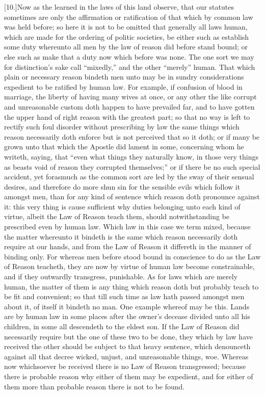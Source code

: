 [10.]Now as the learned in the laws of this land observe, that our statutes sometimes are only the affirmation or ratification of that which by common law was held before; so here it is not to be omitted that generally all laws human, which are made for the ordering of politic societies, be either such as establish some duty whereunto all men by the law of reason did before stand bound; or else such as make that a duty now which before was none. The one sort we may for distinction’s sake call “mixedly,” and the other “merely” human. That which plain or necessary reason bindeth men unto may be in sundry considerations expedient to be ratified by human law. For example, if confusion of blood in marriage, the liberty of having many wives at once, or any other the like corrupt and unreasonable custom doth happen to have prevailed far, and to have gotten the upper hand of right reason with the greatest part; so that no way is left to rectify such foul disorder without prescribing by law the same things which reason necessarily doth enforce but is not perceived that so it doth; or if many be grown unto that which the Apostle did lament in some, concerning whom he writeth, saying, that “even what things they naturally know, in those very things as beasts void of reason they corrupted themselves;” or if there be no such special accident, yet forasmuch as the common sort are led by the sway of their  sensual desires, and therefore do more shun sin for the sensible evils which follow it amongst men, than for any kind of sentence which reason doth pronounce against it: this very thing is cause sufficient why duties belonging unto each kind of virtue, albeit the Law of Reason teach them, should notwithstanding be prescribed even by human law. Which law in this case we term mixed, because the matter whereunto it bindeth is the same which reason necessarily doth require at our hands, and from the Law of Reason it differeth in the manner of binding only. For whereas men before stood bound in conscience to do as the Law of Reason teacheth, they are now by virtue of human law become constrainable, and if they outwardly transgress, punishable. As for laws which are merely human, the matter of them is any thing which reason doth but probably teach to be fit and convenient; so that till such time as law hath passed amongst men about it, of itself it bindeth no man. One example whereof may be this. Lands are by human law in some places after the owner’s decease divided unto all his children, in some all descendeth to the eldest son. If the Law of Reason did necessarily require but the one of these two to be done, they which by law have received the other should be subject to that heavy sentence, which denounceth against all that decree wicked, unjust, and unreasonable things, woe. Whereas now whichsoever be received there is no Law of Reason transgressed; because there is probable reason why either of them may be expedient, and for either of them more than probable reason there is not to be found.

